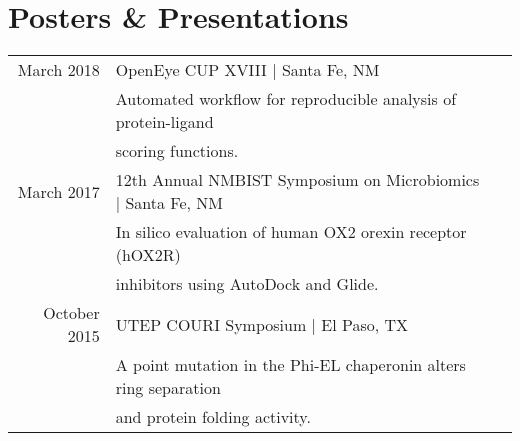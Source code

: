 \documentclass[]{deedy-resume-openfont}
\begin{document}
\begin{minipage}[t]{0.66\textwidth}
\section{Posters \& Presentations} 
\begin{tabular}{rll}
March 2018      & OpenEye CUP XVIII | Santa Fe, NM \\
                & Automated workflow for reproducible analysis of protein-ligand \\
                & scoring functions.\\
March 2017      & 12th Annual NMBIST Symposium on Microbiomics | Santa Fe, NM \\
                & In silico evaluation of human OX2 orexin receptor (hOX2R) \\
                & inhibitors using AutoDock and Glide. \\
October 2015    & UTEP COURI Symposium | El Paso, TX \\
                & A point mutation in the Phi-EL chaperonin alters ring separation \\
                & and protein folding activity. \\
\end{tabular}
\sectionsep

\end{minipage} 
\end{document}
